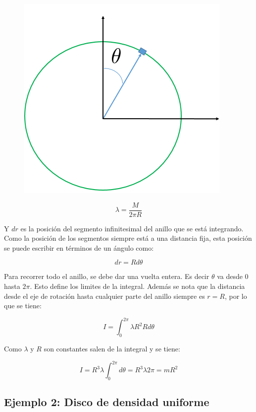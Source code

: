 \documentclass[a4paper,11pt]{article}
\begin{document}
\begin{figure}
	\includegraphics[scale=0.5]{./im/anillo2}
\end{figure}
$$ \lambda = \frac{M}{2 \pi R } $$

Y $dr$ es la posición del segmento infinitesimal del anillo que se está integrando. Como la posición de los segmentos siempre está a una distancia fija, esta posición se puede escribir en términos de un ángulo como:

$$ dr = R d\theta$$

Para recorrer todo el anillo, se debe dar una vuelta entera. Es decir $\theta$ va desde 0 hasta $2\pi$. Esto define los limites de la integral. Además se nota que la distancia desde el eje de rotación hasta cualquier parte del anillo siempre es $r=R$, por lo que se tiene:


$$ I = \int^{2\pi}_{0} \lambda  R^2 R d\theta$$

Como $\lambda$ y $R$ son constantes salen de la integral y se tiene:

$$ I = R^3 \lambda \int_{0}^{2\pi} d\theta = R^3 \lambda 2\pi = m R^2 $$


\subsection{Ejemplo 2: Disco de densidad uniforme}
\end{document}

